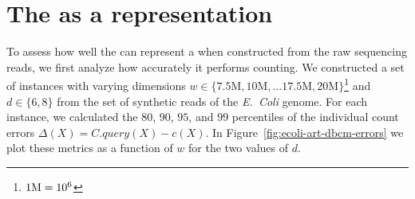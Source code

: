 \section{The \dBCM as a \dBG representation}
\label{sec:results-dbcm-counting}

To assess how well the \dBCM can represent a \dBG when constructed from the raw sequencing reads, we first analyze how accurately it performs \kmer counting. We constructed a set of \dBCM instances with varying dimensions $w \in \{7.5\text{M}, 10\text{M}, \ldots 17.5\text{M}, 20\text{M}\}$\footnote{$1\mega = 10^6$} and $d \in \{6, 8\}$ from the set of synthetic reads of the \emph{E.~Coli} genome. For each instance, we calculated the $80$, $90$, $95$, and $99$ percentiles of the individual count errors $\Delta(X) = C.\mathit{query}(X) - c(X)$. In Figure~\ref{fig:ecoli-art-dbcm-errors} we plot these metrics as a function of $w$ for the two values of $d$.

